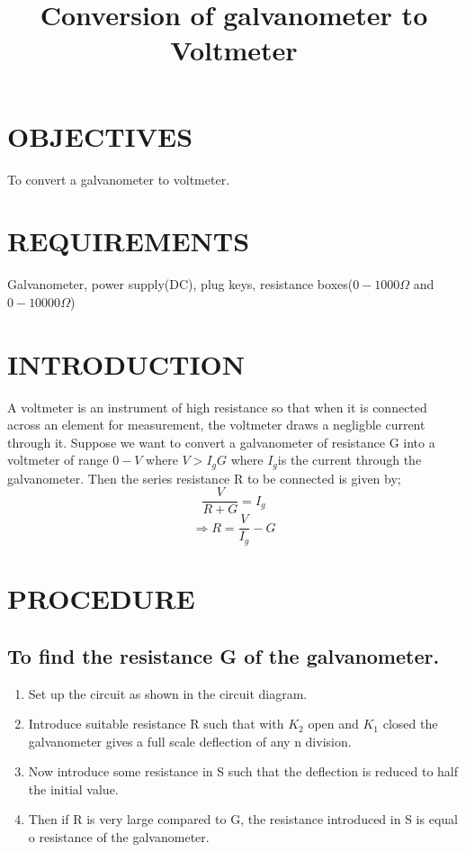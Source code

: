 \documentclass[11pt,a4paper]{article}
\title{Conversion of galvanometer to Voltmeter}
\begin{document}
	\maketitle
	\section{OBJECTIVES}
	To convert a galvanometer to voltmeter.
	\section{REQUIREMENTS}
	Galvanometer, power supply(DC), plug keys, resistance boxes($0-1000\Omega$ and $0-10000\Omega$)
	
	\section{INTRODUCTION}
	A voltmeter is an instrument of high resistance so that when it is connected across an element for measurement, the voltmeter draws a negligble current through it. Suppose we want to convert a galvanometer of resistance G into a voltmeter of range $ 0- V $ where $ V>I_gG$ where $I_g $is the current through the galvanometer. Then the series resistance R to be connected is given by;
		$$\dfrac{V}{R+G} = I_g$$	
		\begin{equation}
		\Rightarrow R = \dfrac{V}{I_g} - G
		\end{equation}
	\section{PROCEDURE}
	\subsection{To find the resistance G of the galvanometer.}
	\begin{enumerate}
		\item  Set up the circuit as shown in the circuit diagram.
		\item Introduce suitable resistance R such that with $K_2$ open and $K_1$ closed the galvanometer gives a full scale deflection of any n division.
		\item Now introduce some resistance in S such that the deflection is reduced to  half the initial value. 
		\item Then if R is very large compared to G, the resistance introduced in S is equal o resistance of the galvanometer.
		 
	\end{enumerate}
\end{document}
